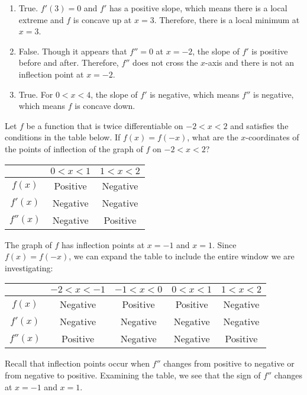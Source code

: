 \begin{Answer}[ref = shape2]
\begin{enumerate}
\item True. $f'(3) = 0$ and $f'$ has a positive slope, which means there is a 
local extreme and $f$ is concave up at $x = 3$. Therefore, there is a local 
minimum at $x = 3$.
\item False. Though it appears that $f'' = 0$ at $x = -2$, the slope of $f'$ 
is positive before and after. Therefore, $f''$ does not cross the $x$-axis 
and there is not an inflection point at $x = -2$. 
\item True. For $ 0 < x < 4$, the slope of $f'$ is negative, which means 
$f''$ is negative, which means $f$ is concave down. 
\end{enumerate}
\end{Answer}

\begin{Exercise} Let $f$ be a 
function that is twice differentiable on $-2 < x< 2$ and satisfies the 
conditions in the table below. If $f(x) = f(-x)$, what are the $x$-coordinates 
of the points of inflection of the graph of $f$ on $-2 < x < 2$?

\begin{tabular}{|c|c|c|}\hline
 & $0 < x < 1$ & $1 < x < 2$\\\hline
 $f(x)$ & Positive & Negative\\\hline
 $f'(x)$ & Negative & Negative\\\hline
 $f''(x)$ & Negative & Positive\\\hline
\end{tabular}
\end{Exercise}

\begin{Answer}[ref = shape3]
The graph of $f$ has inflection points at $x = -1$ and $x = 1$. Since $f(x) = 
f(-x)$, we can expand the table to include the entire window we are 
investigating:
\begin{tabular}{|c|c|c|c|c|}\hline
 & $-2 < x < -1$ & $-1 < x < 0$ & $0 < x < 1$ & $1 < x < 2$\\\hline
 $f(x)$ & Negative & Positive & Positive & Negative\\\hline
 $f'(x)$ & Negative & Negative & Negative & Negative\\\hline
 $f''(x)$ & Positive & Negative & Negative & Positive\\\hline
\end{tabular}
Recall that inflection points occur when $f''$ changes from positive to 
negative or from negative to positive. Examining the table, we see that the 
sign of $f''$ changes at $x = -1$ and $x = 1$. 
\end{Answer}

